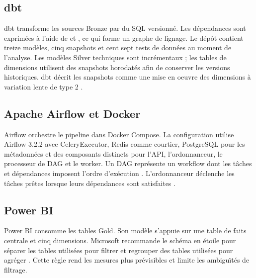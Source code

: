 \subsection{dbt}
dbt transforme les sources Bronze par du SQL versionné. Les dépendances sont exprimées à l'aide de  et , ce qui forme un graphe de lignage. Le dépôt contient treize modèles, cinq snapshots et cent sept tests de données au moment de l'analyse. Les modèles Silver techniques sont incrémentaux ; les tables de dimensions utilisent des snapshots horodatés afin de conserver les versions historiques. dbt décrit les snapshots comme une mise en oeuvre des dimensions à variation lente de type 2 \cite{dbt-snapshots}.

\subsection{Apache Airflow et Docker}
Airflow orchestre le pipeline dans Docker Compose. La configuration utilise Airflow 3.2.2 avec CeleryExecutor, Redis comme courtier, PostgreSQL pour les métadonnées et des composants distincts pour l'API, l'ordonnanceur, le processeur de DAG et le worker. Un DAG représente un workflow dont les tâches et dépendances imposent l'ordre d'exécution \cite{airflow-overview}. L'ordonnanceur déclenche les tâches prêtes lorsque leurs dépendances sont satisfaites \cite{airflow-scheduler}.

\subsection{Power BI}
Power BI consomme les tables Gold. Son modèle s'appuie sur une table de faits centrale et cinq dimensions. Microsoft recommande le schéma en étoile pour séparer les tables utilisées pour filtrer et regrouper des tables utilisées pour agréger \cite{powerbi-star}. Cette règle rend les mesures plus prévisibles et limite les ambiguïtés de filtrage.

